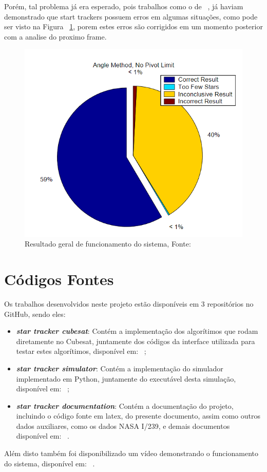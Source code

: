 Porém, tal problema já era esperado, pois trabalhos como o de ~\cite{Cole},
já haviam demonstrado que start trackers possuem erros em algumas situações, como pode ser visto na Figura ~\ref{fig:me_salva},
porem estes erros são corrigidos em um momento posterior com a analise do proximo frame.

\begin{figure}[H]
    \centering
    \includegraphics[width=.8\textwidth]{images/me_salva.png}
    \caption{Resultado geral de funcionamento do sistema, Fonte: ~\cite{Cole}}
    \label{fig:me_salva}
\end{figure}



\section{Códigos Fontes}

Os trabalhos desenvolvidos neste projeto estão disponíveis em 3 repositórios no GitHub, sendo eles:

\begin{itemize}
    \item \textbf{\textit{star tracker cubesat}}: Contém a implementação dos algorítimos que rodam diretamente no Cubesat, 
    juntamente dos códigos da interface utilizada para testar estes algorítimos, disponível em: ~\cite[]{Parreira_star_tracker_cubesat_2022};
    \item \textbf{\textit{star tracker simulator}}: Contém a implementação do simulador implementado em Python, 
    juntamente do executável desta simulação, disponível em: ~\cite[]{Parreira_Star_Tracker_Simulator_2022};
    \item \textbf{\textit{star tracker documentation}}: Contém a documentação do projeto, 
    incluindo o código fonte em latex, do presente documento, assim como outros dados auxiliares, 
    como os dados NASA I/239, e demais documentos disponível em: ~\cite[]{Parreira_Star_Tracker_Cocumentation_2022}.
\end{itemize}

Além disto também foi disponibilizado um vídeo demonstrando o funcionamento do sistema, disponível em: ~\cite[]{Video_Hebert}.